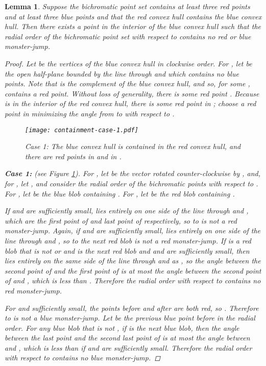 \documentclass[12pt]{article}
\newtheorem{lemma}{Lemma}
\theoremstyle{definition}
\begin{document}
\begin{lemma}
  \label{lem:no-monster-jump-contains}
  Suppose the bichromatic point set  contains at least three red points and at least three blue points and that the red convex hull contains the blue convex hull.
  Then there exists a point  in the interior of the blue convex hull such that the radial order of the bichromatic point set with respect to  contains no red or blue monster-jump.

  \begin{proof}
    Let  be the vertices of the blue convex hull in clockwise order.
    For , let  be the open half-plane bounded by the line through  and  which contains no blue points.
    Note that  is the complement of the blue convex hull, and so, for some ,  contains a red point.
    Without loss of generality, there is some red point .
    Because  is in the interior of the red convex hull, there is some red point in ; choose a red point  in  minimizing the angle from  to  with respect to . 

\begin{figure}
\centering
\texttt{[image: containment-case-1.pdf]}
\caption{Case 1: The blue convex hull is contained in the red convex hull, and
there are red points  in  and  in .}
\label{fig:containment-case-1}
\end{figure}

    \textbf{Case 1:}  (see Figure \ref{fig:containment-case-1}). For , let  be the vector  rotated counter-clockwise by , and, for , let , and consider the radial order of the bichromatic points with respect to .
    For , let  be the blue blob containing .
    For , let  be the red blob containing .

    If  and  are sufficiently small,  lies entirely on one side of the line through  and , which are the first point of  and last point of  respectively, so  to  is not a red monster-jump.
    Again, if  and  are sufficiently small,  lies entirely on one side of the line through  and , so  to the next red blob is not a red monster-jump.
    If  is a red blob that is not  or  and  is the next red blob and  and  are sufficiently small, then  lies entirely on the same side of the line through  and  as , so the angle between the second point of  and the first point of  is at most the angle between the second point of  and , which is less than .
    Therefore the radial order with respect to  contains no red monster-jump.

    For  and  sufficiently small, the points before and after  are both red, so .
    Therefore  to  is not a blue monster-jump.
    Let  be the previous blue point before  in the radial order.
    For any blue blob  that is not , if  is the next blue blob, then the angle between the last point  and the second last point of  is at most the angle between  and , which is less than  if  and  are sufficiently small.
    Therefore the radial order with respect to  contains no blue monster-jump.


\end{proof}
\end{lemma}
\end{document}

